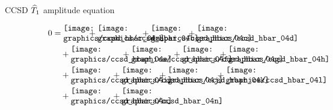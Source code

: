 \begin{frame}{CCSD $\widehat{T}_1$ amplitude equation }

\begin{align*}
    0 &= 
    \parbox{10mm}{\texttt{[image: graphics/ccsd\_hbar\_04a]}}
    + \parbox{18mm}{\texttt{[image: graphics/ccsd\_hbar\_04b]}}
    + \parbox{15mm}{\texttt{[image: graphics/ccsd\_hbar\_04c]}}
    + \parbox{15mm}{\texttt{[image: graphics/ccsd\_hbar\_04d]}} \\
    & \quad + \parbox{21mm}{\texttt{[image: graphics/ccsd\_hbar\_04e]}}
    + \parbox{17mm}{\texttt{[image: graphics/ccsd\_hbar\_04f]}}
    + \parbox{15mm}{\texttt{[image: graphics/ccsd\_hbar\_04g]}}
    + \parbox{15mm}{\texttt{[image: graphics/ccsd\_hbar\_04h]}} \\
    & \quad + \parbox{17mm}{\texttt{[image: graphics/ccsd\_hbar\_04i]}}
    + \parbox{15mm}{\texttt{[image: graphics/ccsd\_hbar\_04j]}}
    + \parbox{20mm}{\texttt{[image: graphics/ccsd\_hbar\_04k]}}
    + \parbox{15mm}{\texttt{[image: graphics/ccsd\_hbar\_04l]}} \\
    & \quad + \parbox{17mm}{\texttt{[image: graphics/ccsd\_hbar\_04m]}}
    + \parbox{15mm}{\texttt{[image: graphics/ccsd\_hbar\_04n]}}
\end{align*}

\end{frame}

    

